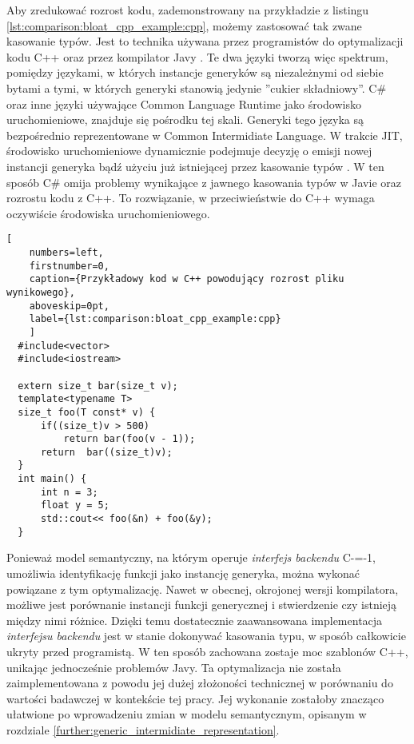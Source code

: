 Aby zredukować rozrost kodu, zademonstrowany na przykładzie z listingu \ref{lst:comparison:bloat_cpp_example:cpp}, możemy zastosować tak zwane kasowanie typów.
Jest to technika używana przez programistów do optymalizacji kodu C++ \cite{becker2007:type_erasure} oraz przez kompilator Javy \cite{nino2007:cost_type_erasure_java}.
Te dwa języki tworzą więc spektrum, pomiędzy językami, w których instancje generyków są niezależnymi od siebie bytami a tymi, w których generyki stanowią jedynie ''cukier składniowy''.
C\# oraz inne języki używające Common Language Runtime \cite{ecma:cli} jako środowisko uruchomieniowe, znajduje się pośrodku tej skali.
Generyki tego języka są bezpośrednio reprezentowane w Common Intermidiate Language.
W trakcie JIT, środowisko uruchomieniowe dynamicznie podejmuje decyzję o emisji nowej instancji generyka bądź użyciu już istniejącej przez kasowanie typów \cite{kennedy2001:design_clr_generics}.
W ten sposób C\# omija problemy wynikające z jawnego kasowania typów w Javie oraz rozrostu kodu z C++.
To rozwiązanie, w przeciwieństwie do C++ wymaga oczywiście środowiska uruchomieniowego.

\begin{minipage}{\textwidth}
  
  \begin{lstlisting}[
    numbers=left,
    firstnumber=0,
    caption={Przykładowy kod w C++ powodujący rozrost pliku wynikowego},
    aboveskip=0pt,
    label={lst:comparison:bloat_cpp_example:cpp}
    ]
  #include<vector>
  #include<iostream>
    
  extern size_t bar(size_t v);
  template<typename T>
  size_t foo(T const* v) {
      if((size_t)v > 500)
          return bar(foo(v - 1));
      return  bar((size_t)v);
  }
  int main() {
      int n = 3;
      float y = 5;
      std::cout<< foo(&n) + foo(&y);
  }
  \end{lstlisting}
\end{minipage}

Ponieważ model semantyczny, na którym operuje \emph{interfejs backendu} C-=-1, umożliwia identyfikację funkcji jako instancję generyka, można wykonać powiązane z tym optymalizację.
Nawet w obecnej, okrojonej wersji kompilatora, możliwe jest porównanie instancji funkcji generycznej i stwierdzenie czy istnieją między nimi różnice.
Dzięki temu dostatecznie zaawansowana implementacja \emph{interfejsu backendu} jest w stanie dokonywać kasowania typu, w sposób całkowicie ukryty przed programistą.
W ten sposób zachowana zostaje moc szablonów C++, unikając jednocześnie problemów Javy.
Ta optymalizacja nie została zaimplementowana z powodu jej dużej złożoności technicznej w porównaniu do wartości badawczej w kontekście tej pracy.
Jej wykonanie zostałoby znacząco ułatwione po wprowadzeniu zmian w modelu semantycznym, opisanym w rozdziale \ref{further:generic_intermidiate_representation}.

